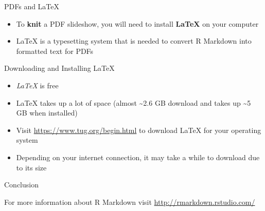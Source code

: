 \documentclass[
  ignorenonframetext,
]{beamer}
\providecommand{\tightlist}{%
  \setlength{\itemsep}{0pt}\setlength{\parskip}{0pt}}
\begin{document}
\begin{frame}{PDFs and LaTeX}
\protect\hypertarget{pdfs-and-latex}{}

\begin{itemize}
\tightlist
\item
  To \textbf{knit} a PDF slideshow, you will need to install
  \textbf{LaTeX} on your computer
\item
  LaTeX is a typesetting system that is needed to convert R Markdown
  into formatted text for PDFs
\end{itemize}

\begin{block}{Downloading and Installing LaTeX}

\begin{itemize}
\tightlist
\item
  \emph{LaTeX} is free
\item
  LaTeX takes up a lot of space (almost \textasciitilde2.6 GB download
  and takes up \textasciitilde5 GB when installed)
\item
  Visit \url{https://www.tug.org/begin.html} to download LaTeX for your
  operating system
\item
  Depending on your internet connection, it may take a while to download
  due to its size
\end{itemize}

\end{block}

\end{frame}

\begin{frame}{Conclusion}
\protect\hypertarget{conclusion}{}

For more information about R Markdown visit
\url{http://rmarkdown.rstudio.com/}

\end{frame}
\end{document}
